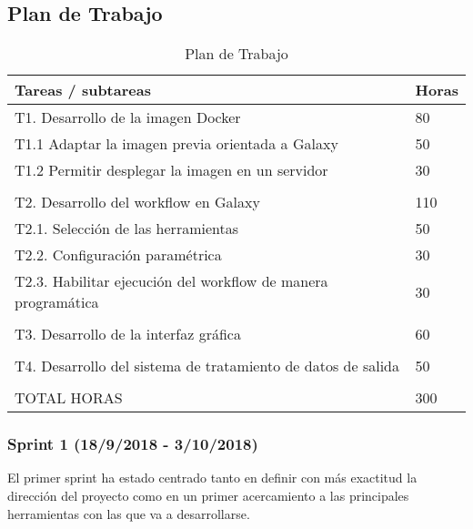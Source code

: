 \subsection{Plan de Trabajo}

\begin{table}[]
\begin{tabular}{|l|l|}
\hline
Tareas / subtareas                                            & Horas \\ \hline
T1. Desarrollo de la imagen Docker                            & 80    \\ \hline
T1.1 Adaptar la imagen previa orientada a Galaxy              & 50    \\ \hline
T1.2 Permitir desplegar la imagen en un servidor              & 30    \\ \hline
                                                              &       \\ \hline
T2. Desarrollo del workflow en Galaxy                         & 110   \\ \hline
T2.1. Selección de las herramientas                           & 50    \\ \hline
T2.2. Configuración paramétrica                               & 30    \\ \hline
T2.3. Habilitar ejecución del workflow de manera programática & 30    \\ \hline
                                                              &       \\ \hline
T3. Desarrollo de la interfaz gráfica                         & 60    \\ \hline
                                                              &       \\ \hline
T4. Desarrollo del sistema de tratamiento de datos de salida  & 50    \\ \hline
                                                              &       \\ \hline
TOTAL HORAS                                                   & 300   \\ \hline
\end{tabular}
\caption{Plan de Trabajo}
\label{my-label}
\end{table}


\subsubsection{Sprint 1 (18/9/2018 - 3/10/2018)}
El primer sprint ha estado centrado tanto en definir con más exactitud la dirección del proyecto como en un primer acercamiento a las principales herramientas con las que va a desarrollarse. 

